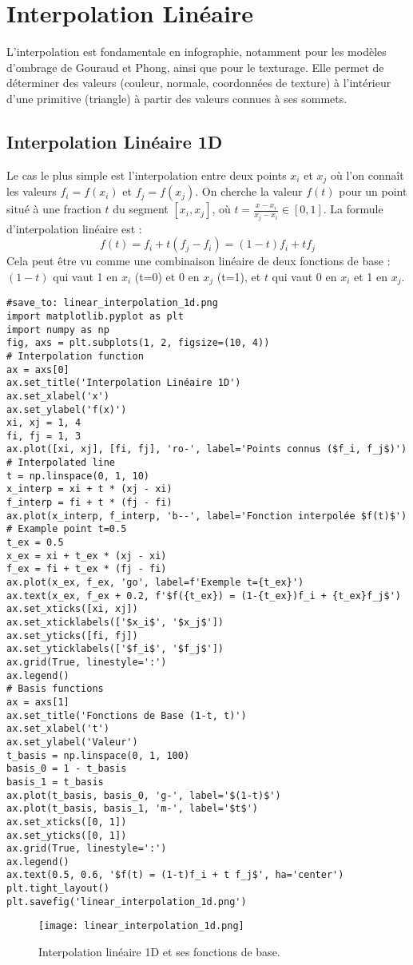 \section{Interpolation Linéaire}
L'interpolation est fondamentale en infographie, notamment pour les modèles d'ombrage de Gouraud et Phong, ainsi que pour le texturage. Elle permet de déterminer des valeurs (couleur, normale, coordonnées de texture) à l'intérieur d'une primitive (triangle) à partir des valeurs connues à ses sommets.
\subsection{Interpolation Linéaire 1D}
Le cas le plus simple est l'interpolation entre deux points \(x_i\) et \(x_j\) où l'on connaît les valeurs \(f_i = f(x_i)\) et \(f_j = f(x_j)\). On cherche la valeur \(f(t)\) pour un point situé à une fraction \(t\) du segment \([x_i, x_j]\), où \(t = \frac{x - x_i}{x_j - x_i} \in [0, 1]\).
La formule d'interpolation linéaire est :
\[ f(t) = f_i + t(f_j - f_i) = (1-t)f_i + t f_j \]
Cela peut être vu comme une combinaison linéaire de deux fonctions de base : \((1-t)\) qui vaut 1 en \(x_i\) (t=0) et 0 en \(x_j\) (t=1), et \(t\) qui vaut 0 en \(x_i\) et 1 en \(x_j\).
\begin{verbatim}
#save_to: linear_interpolation_1d.png
import matplotlib.pyplot as plt
import numpy as np
fig, axs = plt.subplots(1, 2, figsize=(10, 4))
# Interpolation function
ax = axs[0]
ax.set_title('Interpolation Linéaire 1D')
ax.set_xlabel('x')
ax.set_ylabel('f(x)')
xi, xj = 1, 4
fi, fj = 1, 3
ax.plot([xi, xj], [fi, fj], 'ro-', label='Points connus ($f_i, f_j$)')
# Interpolated line
t = np.linspace(0, 1, 10)
x_interp = xi + t * (xj - xi)
f_interp = fi + t * (fj - fi)
ax.plot(x_interp, f_interp, 'b--', label='Fonction interpolée $f(t)$')
# Example point t=0.5
t_ex = 0.5
x_ex = xi + t_ex * (xj - xi)
f_ex = fi + t_ex * (fj - fi)
ax.plot(x_ex, f_ex, 'go', label=f'Exemple t={t_ex}')
ax.text(x_ex, f_ex + 0.2, f'$f({t_ex}) = (1-{t_ex})f_i + {t_ex}f_j$')
ax.set_xticks([xi, xj])
ax.set_xticklabels(['$x_i$', '$x_j$'])
ax.set_yticks([fi, fj])
ax.set_yticklabels(['$f_i$', '$f_j$'])
ax.grid(True, linestyle=':')
ax.legend()
# Basis functions
ax = axs[1]
ax.set_title('Fonctions de Base (1-t, t)')
ax.set_xlabel('t')
ax.set_ylabel('Valeur')
t_basis = np.linspace(0, 1, 100)
basis_0 = 1 - t_basis
basis_1 = t_basis
ax.plot(t_basis, basis_0, 'g-', label='$(1-t)$')
ax.plot(t_basis, basis_1, 'm-', label='$t$')
ax.set_xticks([0, 1])
ax.set_yticks([0, 1])
ax.grid(True, linestyle=':')
ax.legend()
ax.text(0.5, 0.6, '$f(t) = (1-t)f_i + t f_j$', ha='center')
plt.tight_layout()
plt.savefig('linear_interpolation_1d.png')
\end{verbatim}
\begin{figure}[H]
\centering
\texttt{[image: linear\_interpolation\_1d.png]}
\caption{Interpolation linéaire 1D et ses fonctions de base.}
\label{fig:linear_interpolation_1d}
\end{figure}

